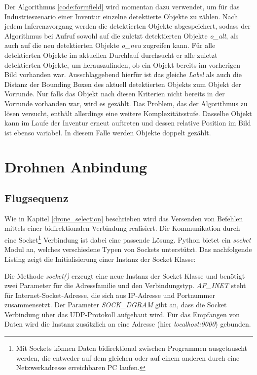 Der Algorithmus \ref{code:formfield} wird momentan dazu verwendet, um für das Industrieszenario einer Inventur einzelne detektierte Objekte zu zählen. Nach jedem Inferenzvorgang werden die detektierten Objekte abgespeichert, sodass der Algorithmus bei Aufruf sowohl auf die zuletzt detektierten Objekte \textit{o\_alt}, als auch auf die neu detektierten Objekte \textit{o\_neu} zugreifen kann. Für alle detektierten Objekte im aktuellen Durchlauf durchsucht er alle zuletzt detektierten Objekte, um herauszufinden, ob ein Objekt bereits im vorherigen Bild vorhanden war. Ausschlaggebend hierfür ist das gleiche \textit{Label} als auch die Distanz der Bounding Boxen des aktuell detektierten Objekts zum Objekt der Vorrunde. Nur falls das Objekt nach diesen Kriterien nicht bereits in der Vorrunde vorhanden war, wird es gezählt. Das Problem, das der Algorithmus zu lösen versucht, enthält allerdings eine weitere Komplexitätsstufe. Dasselbe Objekt kann im Laufe der Inventur erneut auftreten und dessen relative Position im Bild ist ebenso variabel. In diesem Falle werden Objekte doppelt gezählt. 

\section{Drohnen Anbindung}

\subsection*{Flugsequenz}
Wie in Kapitel \ref{drone_selection} beschrieben wird das Versenden von Befehlen mittels einer bidirektionalen Verbindung realisiert. Die Kommunikation durch eine Socket\footnote{Mit Sockets können Daten bidirektional zwischen  Programmen ausgetauscht werden, die entweder auf dem gleichen oder auf einem anderen durch eine Netzwerkadresse erreichbaren PC laufen.} Verbindung ist dabei eine passende Lösung. Python bietet ein \textit{socket} Modul an, welches verschiedene Typen von Sockets unterstützt. Das nachfolgende Listing zeigt die Initialisierung einer Instanz der Socket Klasse:



Die Methode \textit{socket()} erzeugt eine neue Instanz der Socket Klasse und benötigt zwei Parameter für die Adressfamilie und den Verbindungstyp. \textit{AF\_INET} steht für Internet-Socket-Adresse, die sich aus IP-Adresse und Portnummer zusammensetzt. Der Parameter \textit{SOCK\_DGRAM} gibt an, dass die Socket Verbindung über das UDP-Protokoll aufgebaut wird. Für das Empfangen von Daten wird die Instanz zusätzlich an eine Adresse (hier \textit{localhost:9000}) gebunden.

